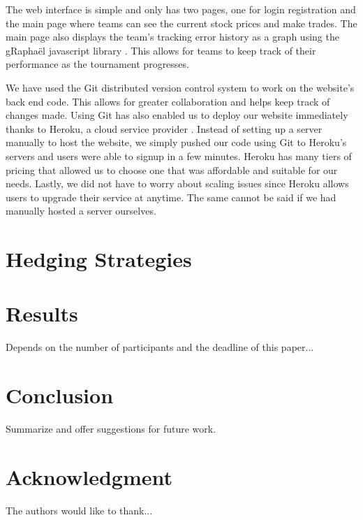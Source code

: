 \documentclass[conference, draftcls]{IEEEtran}
\begin{document}
The web interface is simple and only has two pages, one for login \/ registration and the main page where teams can see the current stock prices and make trades. The main page also displays the team’s tracking error history as a graph using the gRapha\"el javascript library \cite{gRaphael}. This allows for teams to keep track of their performance as the tournament progresses. 

We have used the Git distributed version control system \cite{git} to work on the website's back end code. This allows for greater collaboration and helps keep track of changes made. Using Git has also enabled us to deploy our website immediately thanks to Heroku, a cloud service provider \cite{heroku}. Instead of setting up a server manually to host the website, we simply pushed our code using Git to Heroku's servers and users were able to signup in a few minutes. Heroku has many tiers of pricing that allowed us to choose one that was affordable and suitable for our needs. Lastly, we did not have to worry about scaling issues since Heroku allows users to upgrade their service at anytime. The same cannot be said if we had manually hosted a server ourselves.

\section{Hedging Strategies}

\section{Results}
Depends on the number of participants and the deadline of this paper...

\section{Conclusion}
Summarize and offer suggestions for future work.

\section*{Acknowledgment}
The authors would like to thank...



\end{document}
